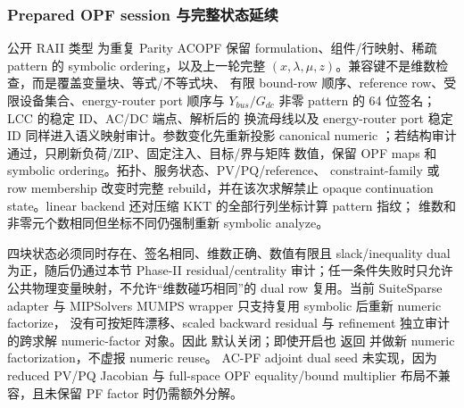 \subsubsection*{Prepared OPF session 与完整状态延续}
公开 RAII 类型  为重复 Parity ACOPF 保留
formulation、组件/行映射、稀疏 pattern 的 symbolic ordering，以及上一轮完整
$(x,\lambda,\mu,z)$。兼容键不是维数检查，而是覆盖变量块、等式/不等式块、
有限 bound-row 顺序、reference row、受限设备集合、energy-router port 顺序与
$Y_{bus}/G_{dc}$ 非零 pattern 的 64 位签名；LCC 的稳定 ID、AC/DC 端点、解析后的
换流母线以及 energy-router port 稳定 ID 同样进入语义映射审计。参数变化先重新投影 canonical numeric
；若结构审计通过，只刷新负荷/ZIP、固定注入、目标/界与矩阵
数值，保留 OPF maps 和 symbolic ordering。拓扑、服务状态、PV/PQ/reference、
constraint-family 或 row membership 改变时完整 rebuild，并在该次求解禁止 opaque
continuation state。linear backend 还对压缩 KKT 的全部行列坐标计算 pattern 指纹；
维数和非零元个数相同但坐标不同仍强制重新 symbolic analyze。

四块状态必须同时存在、签名相同、维数正确、数值有限且 slack/inequality dual
为正，随后仍通过本节 Phase-II residual/centrality 审计；任一条件失败时只允许
公共物理变量映射，不允许“维数碰巧相同”的 dual row 复用。当前 SuiteSparse
adapter 与 MIPSolvers MUMPS wrapper 只支持复用 symbolic 后重新 numeric factorize，
没有可按矩阵漂移、scaled backward residual 与 refinement 独立审计的跨求解
numeric-factor 对象。因此  默认关闭；即使开启也
返回  并做新 numeric factorization，不虚报 numeric reuse。
AC-PF adjoint dual seed 未实现，因为 reduced PV/PQ Jacobian 与 full-space OPF
equality/bound multiplier 布局不兼容，且未保留 PF factor 时仍需额外分解。

